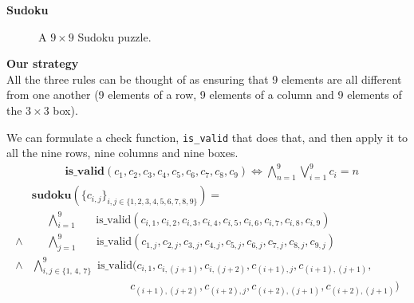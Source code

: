 \documentclass[t,aspectratio=1610]{beamer}
\newcounter{row}
\newcounter{col}
\newcommand\setrow[9]{
  \setcounter{col}{1}
  \foreach \n in {#1, #2, #3, #4, #5, #6, #7, #8, #9} {
    \edef\x{\value{col} - 0.5}
    \edef\y{9.5 - \value{row}}
    \node[anchor=center] at (\x, \y) {\n};
    \stepcounter{col}
  }
  \stepcounter{row}
}
\begin{document}
\begin{frame}
\textbf{Sudoku} \\
\begin{figure}[h]
\begin{center}
\end{center}
\caption{A $9\times 9$ Sudoku puzzle.}
\end{figure}
\end{frame}
\begin{frame}
\textbf{Our strategy} \\

All the three rules can be thought of as ensuring that 9 elements
are all different from one another (9 elements of a row, 9 elements
of a column and 9 elements of the $3 \times 3$ box).

\noindent
We can formulate a check function, \texttt{is\_valid} that does that, and then
apply it to all the nine rows, nine columns and nine boxes.
\begin{align} 
\nonumber &\textbf{is\_valid}\left(  c_{1},  c_{2},  c_{3},  c_{4},  c_{5},  c_{6},  c_{7},  c_{8},  c_{9}  \right) \iff \bigwedge^9_{n=1}  \bigvee^9_{i=1} c_i = n
\end{align}
\pause
\begin{align}
\nonumber &\textbf{sudoku}\left( \{ c_{i, j} \}_{i, j \in \{ 1,2,3,4,5,6,7,8,9\}} \right) =\\
&\,\,\,\,\,\,\,\, \bigwedge^9_{i=1} \,\,\,\,\,\,\,\, \text{ is\_valid}\left(  c_{i,1},  c_{i,2},  c_{i,3},  c_{i,4},  c_{i,5},  c_{i,6},  c_{i,7},  c_{i,8},  c_{i,9}  \right)\\
\wedge &\,\,\,\,\,\,\,\, \bigwedge^9_{j=1} \,\,\,\,\,\,\,\, \text{ is\_valid}\left( c_{1,j},  c_{2,j},  c_{3,j},  c_{4,j},  c_{5,j},  c_{6,j},  c_{7,j},  c_{8,j},  c_{9,j} \right) \\
\wedge &\bigwedge^9_{i,j \in \{1,\,4,\,7\}} \text{ is\_valid}( c_{i,1},  c_{i,(j+1)},  c_{i,(j+2)},  c_{(i+1),j},  c_{(i+1),(j+1)}, \\ 
\nonumber 
& \,\,\,\,\,\,\,\,\,\,\,\,\,\,\,\,\,\,\,\,\,\,\,\,\,\,\,\,\,\,\,\,\,\,\,\,\,\,\,\,\,\,\,\,\,\,\,\,\,\,\,\,\, c_{(i+1),(j+2)},  c_{(i+2),j},  c_{(i+2),(j+1)},  c_{(i+2),(j+1)} )
\end{align}

\end{frame}
\end{document}

